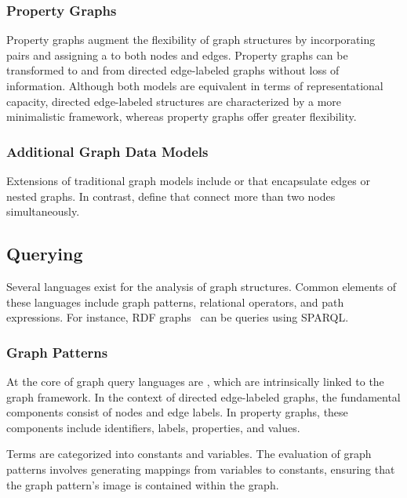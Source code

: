 \subsubsection{Property Graphs}
Property graphs augment the flexibility of graph structures by incorporating  pairs and assigning a  to both nodes and edges. Property graphs can be transformed to and from directed edge-labeled graphs without loss of information. Although both models are equivalent in terms of representational capacity, directed edge-labeled structures are characterized by a more minimalistic framework, whereas property graphs offer greater flexibility. 

\subsubsection{Additional Graph Data Models}
Extensions of traditional graph models include  or  that encapsulate edges or nested graphs. In contrast,  define  that connect more than two nodes simultaneously.

\subsection{Querying}\label{querying}
Several languages exist for the analysis of graph structures. Common elements of these languages include graph patterns, relational operators, and path expressions. For instance, RDF graphs~\cite{Harris2013SPARQL} can be queries using SPARQL. 

\subsubsection{Graph Patterns}
At the core of graph query languages are , which are intrinsically linked to the graph framework. In the context of directed edge-labeled graphs, the fundamental components consist of nodes and edge labels. In property graphs, these components include identifiers, labels, properties, and values.

Terms are categorized into constants and variables. The evaluation of graph patterns involves generating mappings from variables to constants, ensuring that the graph pattern's image is contained within the graph.

